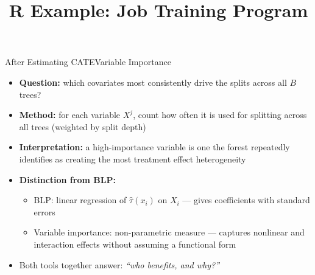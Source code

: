 \documentclass[dvipsnames,hyperref={pdfpagelabels=false}]{beamer}
\begin{document}
\begin{frame}{After Estimating CATE}{Variable Importance}
\begin{itemize}
	\item \textbf{Question:} which covariates most consistently drive the splits across all $B$ trees?
	\vspace{0.3cm}
	\item \textbf{Method:} for each variable $X^j$, count how often it is used for splitting across all trees (weighted by split depth)
	\vspace{0.3cm}
	\item \textbf{Interpretation:} a high-importance variable is one the forest repeatedly identifies as creating the most treatment effect heterogeneity
	\vspace{0.3cm}
	\item \textbf{Distinction from BLP:}
	\vspace{0.1cm}
	\begin{itemize}
		\item BLP: linear regression of $\hat{\tau}(x_i)$ on $X_i$ --- gives coefficients with standard errors
		\vspace{0.1cm}
		\item Variable importance: non-parametric measure --- captures nonlinear and interaction effects without assuming a functional form
	\end{itemize}
	\vspace{0.2cm}
	\item Both tools together answer: \textit{``who benefits, and why?''}
\end{itemize}
\end{frame}




\title[]
{R Example: Job Training Program}

\author{}
\institute{}
\date{}

\begin{frame}{}
	\titlepage
\end{frame}
\end{document}
